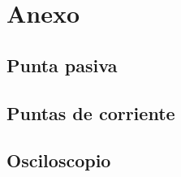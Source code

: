 \documentclass[a4paper,10pt]{article}
\begin{document}
	\newpage
	\section{Anexo}
	\subsection{Punta pasiva}
	

	\newpage
	\subsection{Puntas de corriente}
	
	
	
	\newpage
	\subsection{Osciloscopio}
	
\end{document}
